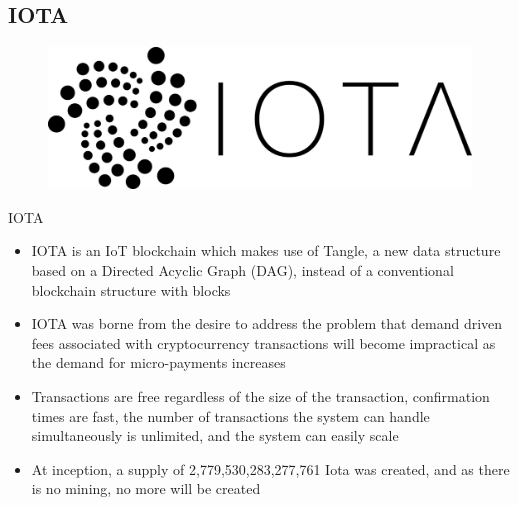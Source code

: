\documentclass[10pt]{beamer}
\begin{document}
\subsection{IOTA}

\begin{frame}
	\begin{figure}[]
		\centering
		\includegraphics  [scale=0.4]{Images/iota-logo}
	\end{figure}
\end{frame}


\begin{frame}{IOTA}
	\begin{itemize}
		\item IOTA is an IoT blockchain which makes use of Tangle, a new data structure based on a Directed Acyclic Graph (DAG), instead of a conventional blockchain structure  with blocks
		\item IOTA was borne from the desire to address the problem that demand driven fees associated with cryptocurrency transactions will become impractical as the demand for micro-payments increases
		\item Transactions are free regardless of the size of the transaction, confirmation times are fast, the number of transactions the system can handle simultaneously is unlimited, and the system can easily scale
		\item At inception, a supply of 2,779,530,283,277,761 Iota was created, and as there is no mining, no more will be created
	\end{itemize}
\end{frame}

\end{document}
